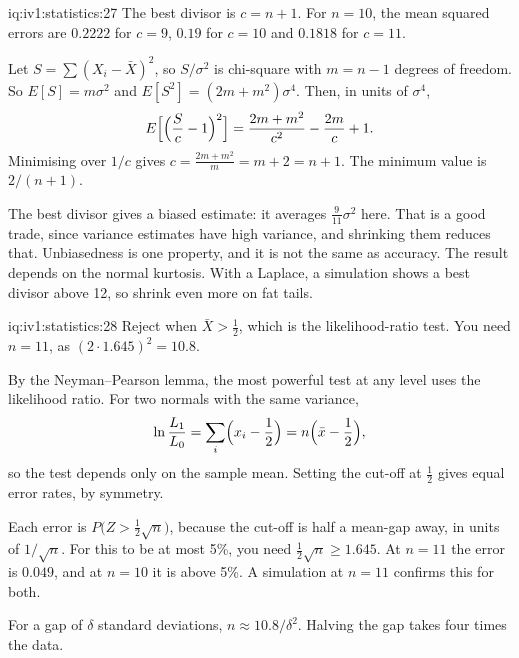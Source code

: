 \begin{solution}{iq:iv1:statistics:27}
The best divisor is $c = n + 1$. For $n = 10$, the mean squared errors are $0.2222$ for $c = 9$, $0.19$ for $c = 10$ and $0.1818$ for $c = 11$.

Let $S = \sum(X_i - \bar{X})^2$, so $S/\sigma^2$ is chi-square with $m = n - 1$ degrees of freedom. So $E[S] = m\sigma^2$ and $E[S^2] = (2m + m^2)\sigma^4$. Then, in units of $\sigma^4$,
\[
E\Bigl[\Bigl(\frac{S}{c} - 1\Bigr)^2\Bigr] = \frac{2m + m^2}{c^2} - \frac{2m}{c} + 1.
\]
Minimising over $1/c$ gives $c = \frac{2m + m^2}{m} = m + 2 = n + 1$. The minimum value is $2/(n + 1)$.

The best divisor gives a biased estimate: it averages $\frac{9}{11}\sigma^2$ here. That is a good trade, since variance estimates have high variance, and shrinking them reduces that. Unbiasedness is one property, and it is not the same as accuracy. The result depends on the normal kurtosis. With a Laplace, a simulation shows a best divisor above 12, so shrink even more on fat tails.

\end{solution}

\begin{solution}{iq:iv1:statistics:28}
Reject when $\bar{X} > \tfrac12$, which is the likelihood-ratio test. You need $n = 11$, as $(2 \cdot 1.645)^2 = 10.8$.

By the Neyman--Pearson lemma, the most powerful test at any level uses the likelihood ratio. For two normals with the same variance,
\[
\ln\frac{L_1}{L_0} = \sum_i \Bigl(x_i - \frac12\Bigr) = n\Bigl(\bar{x} - \frac12\Bigr),
\]
so the test depends only on the sample mean. Setting the cut-off at $\tfrac12$ gives equal error rates, by symmetry.

Each error is $P\bigl(Z > \tfrac12\sqrt{n}\bigr)$, because the cut-off is half a mean-gap away, in units of $1/\sqrt{n}$. For this to be at most 5\%, you need $\tfrac12\sqrt{n} \ge 1.645$. At $n = 11$ the error is $0.049$, and at $n = 10$ it is above 5\%. A simulation at $n = 11$ confirms this for both.

For a gap of $\delta$ standard deviations, $n \approx 10.8/\delta^2$. Halving the gap takes four times the data.

\end{solution}

